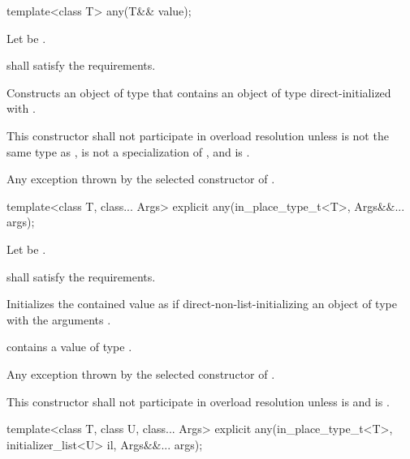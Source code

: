 %
\begin{itemdecl}
template<class T>
  any(T&& value);
\end{itemdecl}

\begin{itemdescr}
\pnum
Let  be .

\pnum
\requires
{} shall satisfy the  requirements.

\pnum
\effects
Constructs an object of type  that contains an object of type  direct-initialized with .

\pnum
\remarks
This constructor shall not participate in overload resolution unless
 is not the same type as ,
 is not a specialization of ,
and  is .

\pnum
\throws
Any exception thrown by the selected constructor of .
\end{itemdescr}

%
\begin{itemdecl}
template<class T, class... Args>
  explicit any(in_place_type_t<T>, Args&&... args);
\end{itemdecl}

\begin{itemdescr}
\pnum
Let  be .

\pnum
\requires {} shall satisfy the  requirements.

\pnum
\effects Initializes the contained value as if direct-non-list-initializing an object of
type  with the arguments .

\pnum
\ensures {} contains a value of type .

\pnum
\throws Any exception thrown by the selected constructor of .

\pnum
\remarks
This constructor shall not participate in overload resolution unless
 is  and
 is .
\end{itemdescr}

%
\begin{itemdecl}
template<class T, class U, class... Args>
  explicit any(in_place_type_t<T>, initializer_list<U> il, Args&&... args);
\end{itemdecl}

